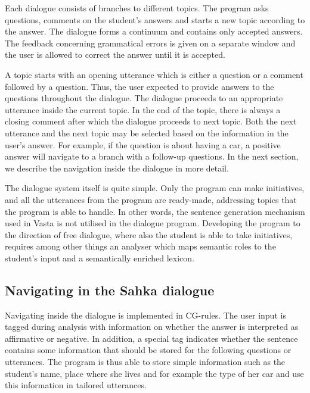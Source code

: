 \documentclass[11pt]{article}
\begin{document}
Each dialogue consists of branches to different topics. The program asks questions, comments on the student's answers and starts a new topic according to the answer. The dialogue forms a continuum and contains only accepted answers. The feedback concerning grammatical errors is given on a separate window and the user is allowed to correct the answer until it is accepted.


A topic starts with an opening utterance which is either a question or a comment followed by a question. Thus, the user expected to provide answers to the questions throughout the dialogue. The dialogue proceeds to an appropriate utterance inside the current topic. In the end of the topic, there is always a closing comment after which the dialogue proceeds to next topic. Both the next utterance and the next topic may be selected based on the information in the user's answer. For example, if the question is about having a car, a positive answer will navigate to a branch with a follow-up questions. In the next section, we describe the navigation inside the dialogue in more detail.

The dialogue system itself is quite simple. Only the program can make initiatives, and all the utterances from the program are ready-made, addressing topics that the program is able to handle. In other words, the sentence generation mechanism used in Vasta is not utilised in the dialogue program. Developing the program to the direction of free dialogue, where also the student is able to take initiatives, requires among other things an analyser which maps semantic roles to the student's input and a semantically enriched lexicon. 


\subsection{Navigating in the Sahka dialogue}\label{navigation}

Navigating inside the dialogue is implemented in CG-rules. The user input is tagged during analysis with information on whether the answer is interpreted as affirmative or negative. In addition, a special tag indicates whether the sentence contains some information that should be stored for the following questions or utterances. The program is thus able to store  simple information such as the student's name, place where she lives and for example the type of her car and use this information in tailored utterances. 
\end{document}
